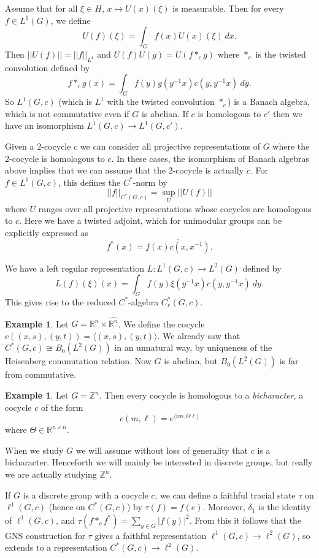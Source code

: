 \documentclass[12pt]{report}
\newcommand{\ZZ}{\mathbb{Z}}
\newcommand{\RR}{\mathbb{R}}
\newcommand{\dfn}[1]{\emph{#1}\index{#1}}
\theoremstyle{definition}
\newtheorem{example}[theorem]{Example}
\begin{document}
Assume that for all $\xi \in H$, $x \mapsto U(x)(\xi)$ is measurable. Then for every $f \in L^1(G)$, we define
$$U(f)(\xi) = \int_G f(x)U(x)(\xi) ~dx.$$
Then $||U(f)|| = ||f||_{L^1}$ and $U(f)U(g) = U(f*_cg)$ where $*_c$ is the twisted convolution defined by
$$f *_c g(x) = \int_G f(y) g(y^{-1}x)c(y, y^{-1}x) ~dy.$$
So $L^1(G, c)$ (which is $L^1$ with the twisted convolution $*_c$) is a Banach algebra, which is not commutative even if $G$ is abelian. If $c$ is homologous to $c'$ then we have an isomorphism $L^1(G, c) \to L^1(G, c')$.

Given a $2$-cocycle $c$ we can consider all projective representations of $G$ where the $2$-cocycle is homologous to $c$. In these cases, the isomorphism of Banach algebras above implies that we can assume that the $2$-cocycle is actually $c$. For $f \in L^1(G, c)$, this defines the $C^*$-norm by
$$||f||_{C^*(G, c)} = \sup_U ||U(f)||$$
where $U$ ranges over all projective representations whose cocycles are homologous to $c$. Here we have a twisted adjoint, which for unimodular groups can be explicitly expressed as
$$f^*(x) = \overline{f(x) c(x, x^{-1})}.$$

We have a left regular representation $L: L^1(G, c) \to L^2(G)$ defined by
$$L(f)(\xi)(x) = \int_G f(y) \xi(y^{-1}x) c(y, y^{-1}x) ~dy.$$
This gives rise to the reduced $C^*$-algebra $C^*_r(G, c)$.

\begin{example}
    Let $G = \RR^n \times \widehat{\RR^n}$. We define the cocycle $c((x, s), (y, t)) = \langle (x, s), (y, t)\rangle$. We already saw that $C^*(G, c) \cong B_0(L^2(G))$ in an unnatural way, by uniqueness of the Heisenberg commutation relation. Now $G$ is abelian, but $B_0(L^2(G))$ is far from commutative.
\end{example}

\begin{example}
    Let $G = \ZZ^n$. Then every cocycle is homologous to a \dfn{bicharacter}, a cocycle $c$ of the form
    $$c(m, \ell) = e^{\langle im, \Theta \ell\rangle}$$
    where $\Theta \in \RR^{n \times n}$.

    When we study $G$ we will assume without loss of generality that $c$ is a bicharacter. Henceforth we will mainly be interested in discrete groups, but really we are actually studying $\ZZ^n$.
\end{example}
    If $G$ is a discrete group with a cocycle $c$, we can define a faithful tracial state $\tau$ on $\ell^1(G, c)$ (hence on $C^*(G, c)$) by $\tau(f) = f(e)$. Moreover, $\delta_1$ is the identity of $\ell^1(G, c)$, and $\tau(f *_c f^*) = \sum_{y \in G} |f(y)|^2$. From this it follows that the GNS construction for $\tau$ gives a faithful representation $\ell^1(G, c) \to \ell^2(G)$, so extends to a representation $C^*(G, c) \to \ell^2(G)$.
\end{document}
